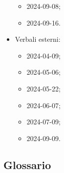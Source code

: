 \begin{itemize}
\begin{itemize}
    \item 2024-09-08;
    \item 2024-09-16.
  \end{itemize}
  \item Verbali esterni:
  \begin{itemize}
    \item 2024-04-09;
    \item 2024-05-06;
    \item 2024-05-22;
    \item 2024-06-07;
    \item 2024-07-09;
    \item 2024-09-09.
  \end{itemize}
\end{itemize}

\subsection{Glossario} 
\GlossarioIntroduzione

